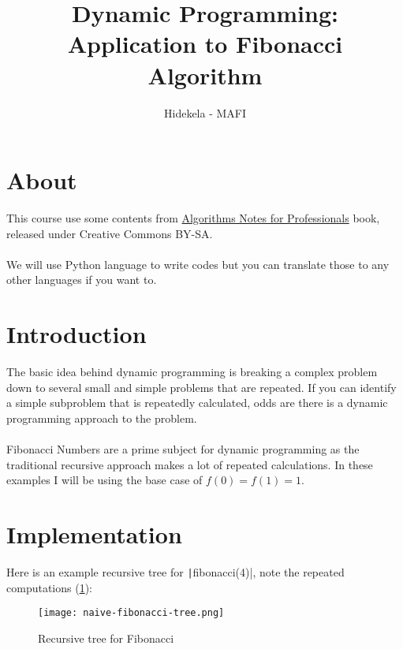 \documentclass{article}
\title{Dynamic Programming: Application to Fibonacci Algorithm}
\author{Hidekela - MAFI}
\newcommand{\inlinecode}[1]{\texttt|#1|}
\begin{document}
	\maketitle

	\section{About}

		This course use some contents from \href{https://goalkicker.com/AlgorithmsBook}{Algorithms Notes for Professionals} book, released under Creative Commons BY-SA.
		\\
		\\
		We will use Python language to write codes but you can translate those to any other languages if you want to.
	
	\section{Introduction}

		The basic idea behind dynamic programming is breaking a complex problem down to several small and simple problems that are repeated. If you can identify a simple subproblem that is repeatedly calculated, odds are there is a dynamic programming approach to the problem. 
		\\
		\\
		Fibonacci Numbers are a prime subject for dynamic programming as the traditional recursive approach makes a lot of repeated calculations. In these examples I will be using the base case of $ f(0) = f(1) = 1 $.
		
	\section{Implementation}
		
		Here is an example recursive tree for \inlinecode{fibonacci(4)}, note the repeated computations (\ref{Recursive tree for Fibonacci}):
		
		\begin{figure}[htbp] %
						
			\texttt{[image: naive-fibonacci-tree.png]}
			
			\caption{Recursive tree for Fibonacci}
			
			\label{Recursive tree for Fibonacci}
			
		\end{figure}
	
\end{document}
